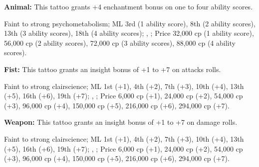 \textbf{Animal:} This tattoo grants +4 enchantment bonus on one to four ability scores.

Faint to strong psychometabolism; ML 3rd (1 ability score), 8th (2 ability scores), 13th (3 ability scores), 18th (4 ability scores); , ; Price 32,000 cp (1 ability score), 56,000 cp (2 ability scores), 72,000 cp (3 ability scores), 88,000 cp (4 ability scores).

\textbf{Fist:} This tattoo grants an insight bonus of +1 to +7 on attacks rolls.

Faint to strong clairscience; ML 1st (+1), 4th (+2), 7th (+3), 10th (+4), 13th (+5), 16th (+6), 19th (+7); , ; Price 6,000 cp (+1), 24,000 cp (+2), 54,000 cp (+3), 96,000 cp (+4), 150,000 cp (+5), 216,000 cp (+6), 294,000 cp (+7).

\textbf{Weapon:} This tattoo grants an insight bonus of +1 to +7 on damage rolls.

Faint to strong clairscience; ML 1st (+1), 4th (+2), 7th (+3), 10th (+4), 13th (+5), 16th (+6), 19th (+7); , ; Price 6,000 cp (+1), 24,000 cp (+2), 54,000 cp (+3), 96,000 cp (+4), 150,000 cp (+5), 216,000 cp (+6), 294,000 cp (+7).